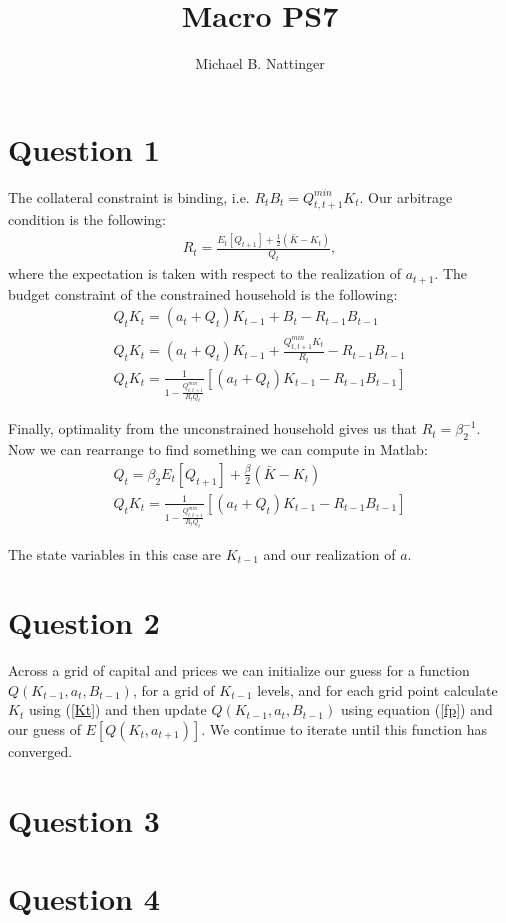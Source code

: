 \documentclass[11pt]{article} %
\title{Macro PS7}
\author{Michael B. Nattinger}
\begin{document}
\maketitle
\section{Question 1}
The collateral constraint is binding, i.e. $R_tB_t = Q_{t,t+1}^{min}K_t$. Our arbitrage condition is the following:
\begin{align*}
R_t = \frac{E_t[Q_{t+1}]+ \frac{1}{2}(\bar{K} - K_t) }{Q_t},
\end{align*} 
where the expectation is taken with respect to the realization of $a_{t+1}$. The budget constraint of the constrained household is the following:
\begin{align*}
Q_tK_t = (a_t + Q_t)K_{t-1} + B_t - R_{t-1}B_{t-1}\\
Q_tK_t = (a_t + Q_t)K_{t-1} + \frac{Q_{t,t+1}^{min}K_t}{R_t}- R_{t-1}B_{t-1}\\
Q_tK_t =  \frac{1}{1-\frac{Q_{t,t+1}^{min}}{R_tQ_t}}\left[ (a_t+Q_t)K_{t-1} - R_{t-1}B_{t-1} \right]
\end{align*}

Finally, optimality from the unconstrained household gives us that $R_t = \beta_2^{-1}$. Now we can rearrange to find something we can compute in Matlab:
\begin{align}
Q_t = \beta_{2}E_t[Q_{t+1}]+ \frac{\beta}{2}(\bar{K} - K_t) \label{fp}\\
Q_tK_t = \frac{1}{1-\frac{Q_{t,t+1}^{min}}{R_tQ_t}}\left[ (a_t+Q_t)K_{t-1} - R_{t-1}B_{t-1} \right] \label{Kt}
\end{align}

The state variables in this case are $K_{t-1}$ and our realization of $a$.

\section{Question 2}
Across a grid of capital and prices we can initialize our guess for a function $Q(K_{t-1},a_t,B_{t-1})$, for a grid of $K_{t-1}$ levels, and for each grid point calculate $K_t$ using (\ref{Kt}) and then update $Q(K_{t-1},a_t,B_{t-1})$ using equation (\ref{fp}) and our guess of $E[Q(K_{t},a_{t+1})]$. We continue to iterate until this function has converged.
\section{Question 3}
\section{Question 4}
\end{document}
